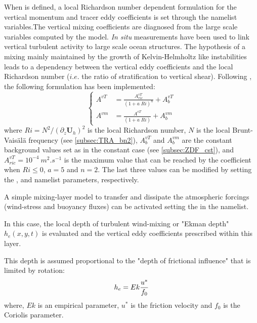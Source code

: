 \documentclass[../tex_main/NEMO_manual]{subfiles}
\begin{document}
When  is defined, a local Richardson number dependent formulation 
for the vertical momentum and tracer eddy coefficients is set through the   
namelist variables.The vertical mixing 
coefficients are diagnosed from the large scale variables computed by the model. 
\textit{In situ} measurements have been used to link vertical turbulent activity to 
large scale ocean structures. The hypothesis of a mixing mainly maintained by the 
growth of Kelvin-Helmholtz like instabilities leads to a dependency between the 
vertical eddy coefficients and the local Richardson number ($i.e.$ the 
ratio of stratification to vertical shear). Following \citet{Pacanowski_Philander_JPO81}, the following 
formulation has been implemented:
\begin{equation} \label{eq:zdfric}
   \left\{      \begin{aligned}
         A^{vT} &= \frac {A_{ric}^{vT}}{\left( 1+a \; Ri \right)^n} + A_b^{vT}       \\
         A^{vm} &= \frac{A^{vT}        }{\left( 1+ a \;Ri  \right)   } + A_b^{vm}
   \end{aligned}    \right.
\end{equation}
where $Ri = N^2 / \left(\partial_z \textbf{U}_h \right)^2$ is the local Richardson 
number, $N$ is the local Brunt-Vais\"{a}l\"{a} frequency (see \autoref{subsec:TRA_bn2}), 
$A_b^{vT} $ and $A_b^{vm}$ are the constant background values set as in the 
constant case (see \autoref{subsec:ZDF_cst}), and $A_{ric}^{vT} = 10^{-4}~m^2.s^{-1}$ 
is the maximum value that can be reached by the coefficient when $Ri\leq 0$, 
$a=5$ and $n=2$. The last three values can be modified by setting the 
,  and  namelist parameters, respectively.

A simple mixing-layer model to transfer and dissipate the atmospheric
 forcings (wind-stress and buoyancy fluxes) can be activated setting 
the  in the namelist.

In this case, the local depth of turbulent wind-mixing or "Ekman depth"
 $h_{e}(x,y,t)$ is evaluated and the vertical eddy coefficients prescribed within this layer.

This depth is assumed proportional to the "depth of frictional influence" that is limited by rotation:
\begin{equation}
         h_{e} = Ek \frac {u^{*}} {f_{0}}  	\\
\end{equation}
where, $Ek$ is an empirical parameter, $u^{*}$ is the friction velocity and $f_{0}$ is the Coriolis 
parameter.
\end{document}
